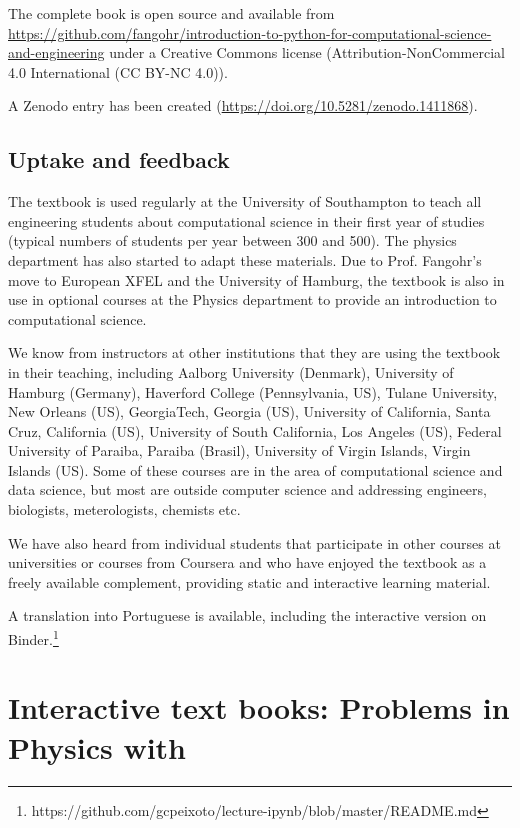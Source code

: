 \documentclass{deliverablereport}
\begin{document}
The complete book is open source and available from\newline
{\tiny\url{https://github.com/fangohr/introduction-to-python-for-computational-science-and-engineering}}\linebreak
under a Creative Commons license (Attribution-NonCommercial 4.0
International (CC BY-NC 4.0)).

A Zenodo entry has been created (\url{https://doi.org/10.5281/zenodo.1411868}).

\subsection{Uptake and feedback}

The textbook is used regularly at the University of Southampton to
teach all engineering students about computational science in their
first year of studies (typical numbers of students per year between
300 and 500). The physics department has also started to adapt these
materials. Due to Prof. Fangohr's move to European XFEL and the
University of Hamburg, the textbook is also in use in optional
courses at the Physics department to provide an introduction to
computational science.

We know from instructors at other institutions that they are using the
textbook in their teaching, including Aalborg University (Denmark),
University of Hamburg (Germany),
Haverford College (Pennsylvania, US), Tulane University, New Orleans
(US), GeorgiaTech, Georgia (US), University of California, Santa Cruz,
California (US), University of South California, Los Angeles
(US), Federal University of Paraiba, Paraiba (Brasil), University of
Virgin Islands, Virgin Islands (US). Some of these courses are
in the area of computational science and data science, but most
are outside computer science and addressing engineers, biologists,
meterologists, chemists etc.

We have also heard from individual students that participate in other
courses at universities or courses from Coursera and who have enjoyed
the textbook as a freely available complement, providing static and
interactive learning material.

A translation into Portuguese is available, including the interactive
version on Binder.\footnote{https://github.com/gcpeixoto/lecture-ipynb/blob/master/README.md}
\pagebreak



\section{Interactive text books: Problems in Physics with \SageMath}
\label{seq:problems-in-physics}
\end{document}
